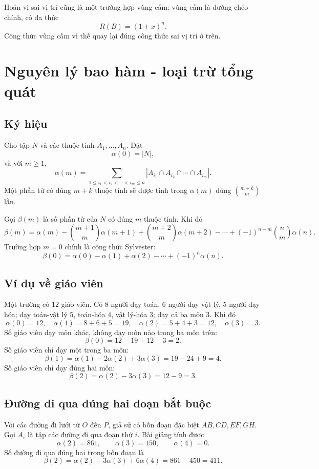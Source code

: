 \documentclass[11pt]{article}
\newcommand{\C}[2]{\binom{#1}{#2}}
\newcommand{\card}[1]{\left|#1\right|}
\begin{document}
Hoán vị sai vị trí cũng là một trường hợp vùng cấm: vùng cấm là đường chéo
chính, có đa thức
\[
  R(B)=(1+x)^n.
\]
Công thức vùng cấm vì thế quay lại đúng công thức sai vị trí ở trên.

\section{Nguyên lý bao hàm - loại trừ tổng quát}

\subsection{Ký hiệu}

Cho tập \(N\) và các thuộc tính \(A_1,\ldots,A_n\). Đặt
\[
  \alpha(0)=\card N,
\]
và với \(m\ge1\),
\[
  \alpha(m)=
  \sum_{1\le i_1<i_2<\cdots<i_m\le n}
  \card{A_{i_1}\cap A_{i_2}\cap\cdots\cap A_{i_m}}.
\]
Một phần tử có đúng \(m+k\) thuộc tính sẽ được tính trong \(\alpha(m)\) đúng
\(\C{m+k}{m}\) lần.

Gọi \(\beta(m)\) là số phần tử của \(N\) có đúng \(m\) thuộc tính. Khi đó
\[
  \beta(m)
  =
  \alpha(m)-\C{m+1}{m}\alpha(m+1)
  +\C{m+2}{m}\alpha(m+2)
  -\cdots
  +(-1)^{n-m}\C nm\alpha(n).
\]
Trường hợp \(m=0\) chính là công thức Sylvester:
\[
  \beta(0)=\alpha(0)-\alpha(1)+\alpha(2)-\cdots+(-1)^n\alpha(n).
\]

\subsection{Ví dụ về giáo viên}

Một trường có \(12\) giáo viên. Có \(8\) người dạy toán, \(6\) người dạy vật
lý, \(5\) người dạy hóa; dạy toán-vật lý \(5\), toán-hóa \(4\), vật lý-hóa
\(3\); dạy cả ba môn \(3\). Khi đó
\[
  \alpha(0)=12,\quad \alpha(1)=8+6+5=19,\quad
  \alpha(2)=5+4+3=12,\quad \alpha(3)=3.
\]
Số giáo viên dạy môn khác, không dạy môn nào trong ba môn trên:
\[
  \beta(0)=12-19+12-3=2.
\]
Số giáo viên chỉ dạy một trong ba môn:
\[
  \beta(1)=\alpha(1)-2\alpha(2)+3\alpha(3)=19-24+9=4.
\]
Số giáo viên chỉ dạy đúng hai môn:
\[
  \beta(2)=\alpha(2)-3\alpha(3)=12-9=3.
\]

\subsection{Đường đi qua đúng hai đoạn bắt buộc}

Với các đường đi lưới từ \(O\) đến \(P\), giả sử có bốn đoạn đặc biệt
\(AB,CD,EF,GH\). Gọi \(A_i\) là tập các đường đi qua đoạn thứ \(i\). Bài
giảng tính được
\[
  \alpha(2)=861,\qquad \alpha(3)=150,\qquad \alpha(4)=0.
\]
Số đường đi qua đúng hai trong bốn đoạn là
\[
  \beta(2)=\alpha(2)-3\alpha(3)+6\alpha(4)=861-450=411.
\]
\end{document}
